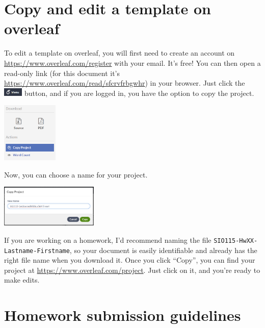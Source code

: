 \documentclass[letterus,times]{SIOpset}
\begin{document}
\section{Copy and edit a template on overleaf}
To edit a template on overleaf, you will first need to create an account on \url{https://www.overleaf.com/register} with your email. 
It's free! 
You can then open a read-only link (for this document it's \url{https://www.overleaf.com/read/sfcrvfrbgwhr}) in your browser. 
Just click the 
\includegraphics[width=0.07\textwidth]{figs/intro-menu.png} 
button, and if you are logged in, you have the option to copy the project.

\includegraphics[width=0.2\textwidth]{figs/intro-copy-a-project.png}

Now, you can choose a name for your project.

\includegraphics[width=0.35\textwidth]{figs/intro-copy-new-name.png}

If you are working on a homework, I'd recommend naming the file
\texttt{SIO115-HwXX-Lastname-Firstname}, so your document is easily identifiable and already has the right file name when you download it. 
Once you click ``Copy'', you can find your project at \url{https://www.overleaf.com/project}. 
Just click on it, and you're ready to make edits. 

\section{Homework submission guidelines}
\end{document}
